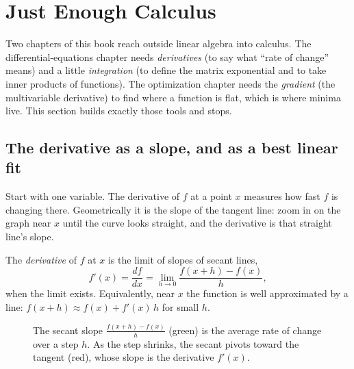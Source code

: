 \section{Just Enough Calculus}
\label{ch39:calculus}

Two chapters of this book reach outside linear algebra into calculus. The differential-equations
chapter needs \emph{derivatives} (to say what ``rate of change'' means) and a little
\emph{integration} (to define the matrix exponential and to take inner products of functions). The
optimization chapter needs the \emph{gradient} (the multivariable derivative) to find where a
function is flat, which is where minima live. This section builds exactly those tools and stops.

\subsection{The derivative as a slope, and as a best linear fit}
\label{ch39:derivative}

Start with one variable. The derivative of $f$ at a point $x$ measures how fast $f$ is changing
there. Geometrically it is the slope of the tangent line: zoom in on the graph near $x$ until the
curve looks straight, and the derivative is that straight line's slope.

\begin{formalbox}
The \emph{derivative} of $f$ at $x$ is the limit of slopes of secant lines,
\[
f'(x) = \frac{df}{dx} = \lim_{h\to 0}\frac{f(x+h) - f(x)}{h},
\]
when the limit exists. Equivalently, near $x$ the function is well approximated by a line:
$f(x+h) \approx f(x) + f'(x)\,h$ for small $h$.
\end{formalbox}

\begin{figure}[H]
\centering
{}
\caption{The secant slope $\frac{f(x+h)-f(x)}{h}$ (green) is the average rate of change over a step
$h$. As the step shrinks, the secant pivots toward the tangent (red), whose slope is the derivative
$f'(x)$.}
\label{ch39:fig-derivative}
\end{figure}

